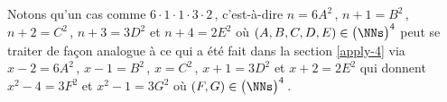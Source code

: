 \begin{remark}
	Notons qu'un cas comme 
	$6 \cdot 1 \cdot 1 \cdot 3 \cdot 2$\,,
	c'est-à-dire
	$n = 6 A^2$\,, $n + 1 = B^2$\,, $n + 2 = C^2$\,, $n + 3 = 3 D^2$ et $n + 4 = 2 E^2$ 
	où $(A, B, C, D, E) \in \big( \NNs \big)^4$
	peut se traiter de façon analogue à ce qui a été fait dans la section \ref{apply-4} via
	$x - 2 = 6 A^2$\,, $x - 1 = B^2$\,, $x = C^2$\,, $x + 1 = 3 D^2$ et $x + 2 = 2 E^2$
	qui donnent
	$x^2 - 4 = 3 F^2$ et $x^2 - 1 = 3 G^2$
	où $(F, G) \in \big( \NNs \big)^4$\,.
\end{remark}
